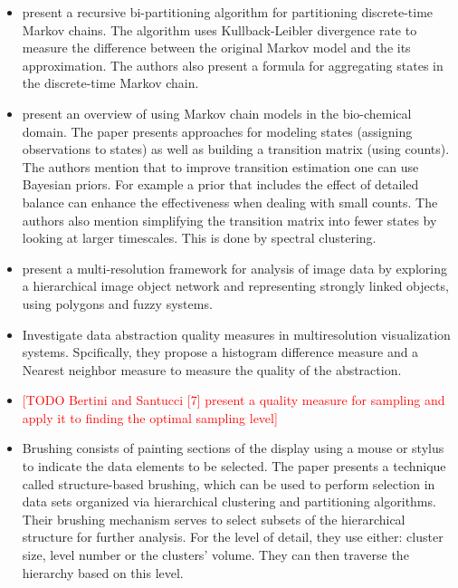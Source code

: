 \begin{itemize}
	\item \cite{5746509} present a recursive bi-partitioning algorithm for partitioning discrete-time Markov chains. The 
	algorithm uses Kullback-Leibler divergence rate to measure the difference between the original Markov
	model and the its approximation. The authors also present a formula for aggregating states in the discrete-time
	Markov chain.
	
	\item \cite{pande-beauchamp-bowman:2010:methods:markov-model-review} present an overview of using Markov chain models in the bio-chemical domain. The paper
	presents approaches for modeling states (assigning observations to states) as well as building a transition
	matrix (using counts). The authors mention that to improve transition estimation one can use Bayesian priors.
	For example a prior that includes the effect of detailed balance can enhance the effectiveness when dealing with
	small counts. The authors also mention simplifying the transition matrix into fewer states by looking at larger
	timescales. This is done by spectral clustering.
	
	\item \cite{Benz2004239} present a multi-resolution framework for analysis of image data by exploring a hierarchical
	image object network and representing strongly linked objects, using polygons and fuzzy systems.
	
	\item \cite{4015421} Investigate data abstraction quality measures in multiresolution visualization systems. Spcifically, they propose
	a histogram difference measure and a Nearest neighbor measure to measure the quality of the abstraction.
	
	\item \textcolor{red}{[TODO Bertini and Santucci [7] present a quality measure for sampling and apply it to finding the optimal sampling level]}
	
	\item \cite{Fua:2000:SBM:614278.614457} Brushing consists of painting sections of the display using a 
	mouse or stylus to indicate the data elements to be selected. The paper presents a technique called
	structure-based brushing, which can be used to perform selection in data sets organized via hierarchical clustering
	and partitioning algorithms. Their brushing mechanism serves to select subsets of the hierarchical structure
	for further analysis. For the level of detail, they use either: cluster size, level number or the clusters' volume.
	They can then traverse the hierarchy based on this level.
	

\end{itemize}
